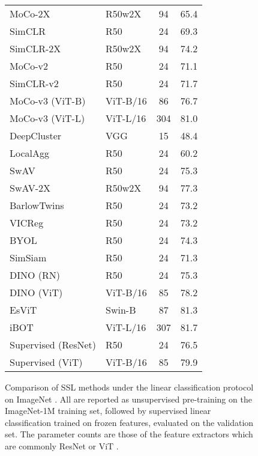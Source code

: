 \documentclass[lettersize,journal]{IEEEtran}
\begin{document}
\begin{figure*}[h!]
\begin{minipage}[b]{0.50\linewidth}
{\begin{tabular}[b]{llcc}
MoCo-2X          & R50w2X        & 94             & 65.4           \\
SimCLR~\cite{chen2020simple}          & R50           & 24             & 69.3           \\
SimCLR-2X        & R50w2X        & 94             & 74.2           \\
MoCo-v2~\cite{chen2020improved}         & R50           & 24             & 71.1           \\
SimCLR-v2~\cite{chen2020big}       & R50           & 24             & 71.7           \\
MoCo-v3 (ViT-B)~\cite{chen2021empirical}   & ViT-B/16         & 86             & 76.7           \\
MoCo-v3 (ViT-L)    & ViT-L/16    & 304            & 81.0           \\
DeepCluster~\cite{caron2018deep}     & VGG           & 15             & 48.4           \\
LocalAgg~\cite{zhuang2019local}        & R50           & 24             & 60.2           \\
SwAV~\cite{caron2020unsupervised}            & R50           & 24             & 75.3           \\
SwAV-2X          & R50w2X        & 94             & 77.3           \\
BarlowTwins~\cite{zbontar2021barlow}     & R50           & 24             & 73.2           \\
VICReg~\cite{bardes2021vicreg}          & R50           & 24             & 73.2           \\
BYOL~\cite{grill2020bootstrap}             & R50           & 24             & 74.3           \\
SimSiam~\cite{chen2021exploring}         & R50           & 24             & 71.3           \\
DINO (RN)~\cite{caron2021emerging}            & R50           & 24             & 75.3           \\
DINO (ViT)  & ViT-B/16      & 85             & 78.2           \\
EsViT~\cite{li2021efficient}           & Swin-B        & 87             & 81.3           \\ 
iBOT~\cite{zhou2021ibot}            & ViT-L/16         & 307            & 81.7           \\    
Supervised (ResNet)    & R50    & 24     & 76.5      \\
Supervised (ViT)       & ViT-B/16    & 85    & 79.9    \\ \hline
\end{tabular}
}
\end{minipage}
\caption{Comparison of SSL methods under the linear classification protocol on ImageNet \cite{deng2009imagenet}. All are reported as unsupervised pre-training on the ImageNet-1M training set, followed by supervised linear classification trained on frozen features, evaluated on the validation set. The parameter counts are those of the feature extractors which are commonly ResNet \cite{he2016deep} or ViT \cite{dosovitskiy2020image}.}
\label{fig:imagenet-accuracy}
\end{figure*}
\end{document}
